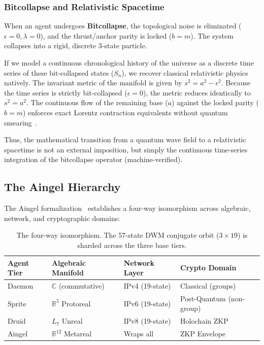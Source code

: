 \subsubsection{Bitcollapse and Relativistic Spacetime}
When an agent undergoes \textbf{Bitcollapse}, the topological noise is eliminated ($\epsilon = 0, \lambda = 0$), and the thrust/anchor parity is locked ($b = m$). The system collapses into a rigid, discrete 3-state particle. 

If we model a continuous chronological history of the universe as a discrete time series of these bit-collapsed states ($S_n$), we recover classical relativistic physics natively. The invariant metric of the manifold is given by $s^2 = a^2 - \epsilon^2$. Because the time series is strictly bit-collapsed ($\epsilon = 0$), the metric reduces identically to $s^2 = a^2$. The continuous flow of the remaining base ($a$) against the locked parity ($b=m$) enforces exact Lorentz contraction equivalents without quantum smearing~\cite{Einstein1905}.

Thus, the mathematical transition from a quantum wave field to a relativistic spacetime is not an external imposition, but simply the continuous time-series integration of the bitcollapse operator (machine-verified).



\subsection{The Aingel Hierarchy}

The Aingel formalization~\cite{Aingel} establishes a four-way isomorphism across algebraic, network, and cryptographic domains:

\begin{table}[H]
\centering
\begin{tabular}{@{}llll@{}}
\toprule
\textbf{Agent Tier} & \textbf{Algebraic Manifold} & \textbf{Network Layer} & \textbf{Crypto Domain} \\
\midrule
Daemon & $\mathbb{C}$ (commutative) & IPv4 (19-state) & Classical (groups) \\
Sprite & $\mathbb{R}^5$ Protoreal & IPv6 (19-state) & Post-Quantum (non-group) \\
Druid & $L_7$ Unreal & IPv8 (19-state) & Holochain ZKP \\
Aingel & $\mathbb{R}^{12}$ Metareal & Wraps all & ZKP Envelope \\
\bottomrule
\end{tabular}
\caption{The four-way isomorphism. The 57-state DWM conjugate orbit ($3 \times 19$) is sharded across the three base tiers.}
\end{table}

